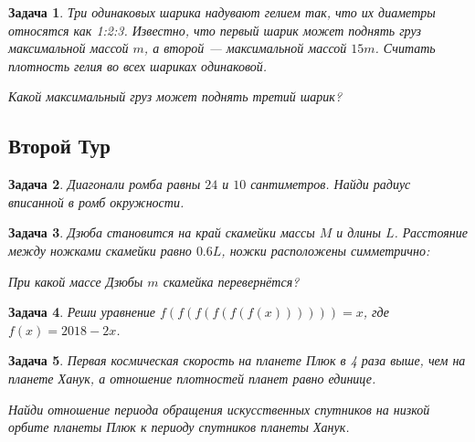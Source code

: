 \documentclass[12pt]{article}
\theoremstyle{break}
\newtheorem{problem}{Задача}[subsection]
\begin{document}
\begin{problem}
Три одинаковых шарика надувают гелием так, что их диаметры относятся как 1:2:3.
Известно, что первый шарик может поднять груз максимальной массой $m$,
а второй — максимальной массой $15m$. Считать плотность гелия во всех шариках одинаковой.

Какой максимальный груз может поднять третий шарик?
\end{problem}


\newpage
\subsection{Второй Тур}


\begin{problem}
Диагонали ромба равны $24$ и $10$ сантиметров. Найди радиус вписанной в ромб окружности.
\end{problem}

\begin{problem}
Дзюба становится на край скамейки массы $M$ и длины $L$.
Расстояние между ножками скамейки равно $0.6L$,
ножки расположены симметрично:

\begin{minipage}{0.8\textwidth}
\begin{center}
\end{center}
\end{minipage}



При какой массе Дзюбы $m$ скамейка перевернётся?
\end{problem}



\begin{problem}
Реши уравнение $f(f(f(f(f(f(x)))))) = x$, где $f(x) = 2018 - 2x$.
\end{problem}



\begin{problem}
Первая космическая скорость на планете Плюк
в 4 раза выше, чем на планете Ханук, а отношение плотностей планет равно единице.

Найди отношение периода обращения искусственных спутников
на низкой орбите планеты Плюк к периоду спутников планеты Ханук.
\end{problem}
\end{document}
